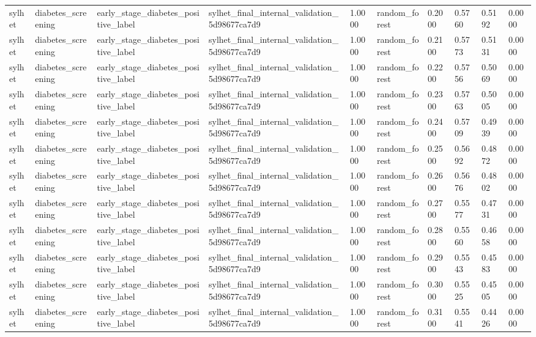 \begin{tabular}{llllllllll}
sylhet & diabetes\_screening & early\_stage\_diabetes\_positive\_label & sylhet\_final\_internal\_validation\_5d98677ca7d9 & 1.0000 & random\_forest & 0.2000 & 0.5760 & 0.5192 & 0.0000 \\
sylhet & diabetes\_screening & early\_stage\_diabetes\_positive\_label & sylhet\_final\_internal\_validation\_5d98677ca7d9 & 1.0000 & random\_forest & 0.2100 & 0.5773 & 0.5131 & 0.0000 \\
sylhet & diabetes\_screening & early\_stage\_diabetes\_positive\_label & sylhet\_final\_internal\_validation\_5d98677ca7d9 & 1.0000 & random\_forest & 0.2200 & 0.5756 & 0.5069 & 0.0000 \\
sylhet & diabetes\_screening & early\_stage\_diabetes\_positive\_label & sylhet\_final\_internal\_validation\_5d98677ca7d9 & 1.0000 & random\_forest & 0.2300 & 0.5763 & 0.5005 & 0.0000 \\
sylhet & diabetes\_screening & early\_stage\_diabetes\_positive\_label & sylhet\_final\_internal\_validation\_5d98677ca7d9 & 1.0000 & random\_forest & 0.2400 & 0.5709 & 0.4939 & 0.0000 \\
sylhet & diabetes\_screening & early\_stage\_diabetes\_positive\_label & sylhet\_final\_internal\_validation\_5d98677ca7d9 & 1.0000 & random\_forest & 0.2500 & 0.5692 & 0.4872 & 0.0000 \\
sylhet & diabetes\_screening & early\_stage\_diabetes\_positive\_label & sylhet\_final\_internal\_validation\_5d98677ca7d9 & 1.0000 & random\_forest & 0.2600 & 0.5676 & 0.4802 & 0.0000 \\
sylhet & diabetes\_screening & early\_stage\_diabetes\_positive\_label & sylhet\_final\_internal\_validation\_5d98677ca7d9 & 1.0000 & random\_forest & 0.2700 & 0.5577 & 0.4731 & 0.0000 \\
sylhet & diabetes\_screening & early\_stage\_diabetes\_positive\_label & sylhet\_final\_internal\_validation\_5d98677ca7d9 & 1.0000 & random\_forest & 0.2800 & 0.5560 & 0.4658 & 0.0000 \\
sylhet & diabetes\_screening & early\_stage\_diabetes\_positive\_label & sylhet\_final\_internal\_validation\_5d98677ca7d9 & 1.0000 & random\_forest & 0.2900 & 0.5543 & 0.4583 & 0.0000 \\
sylhet & diabetes\_screening & early\_stage\_diabetes\_positive\_label & sylhet\_final\_internal\_validation\_5d98677ca7d9 & 1.0000 & random\_forest & 0.3000 & 0.5525 & 0.4505 & 0.0000 \\
sylhet & diabetes\_screening & early\_stage\_diabetes\_positive\_label & sylhet\_final\_internal\_validation\_5d98677ca7d9 & 1.0000 & random\_forest & 0.3100 & 0.5541 & 0.4426 & 0.0000 \\

\end{tabular}
